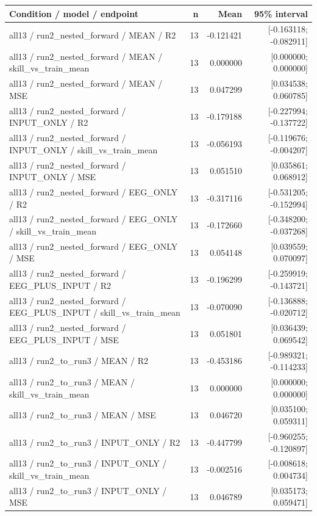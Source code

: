 \begin{longtable}{p{.56\linewidth}rrr}
\toprule Condition / model / endpoint & n & Mean & 95\% interval\\\midrule
all13 / run2\_nested\_forward / MEAN / R2 & 13 & -0.121421 & [-0.163118; -0.082911] \\
all13 / run2\_nested\_forward / MEAN / skill\_vs\_train\_mean & 13 & 0.000000 & [0.000000; 0.000000] \\
all13 / run2\_nested\_forward / MEAN / MSE & 13 & 0.047299 & [0.034538; 0.060785] \\
all13 / run2\_nested\_forward / INPUT\_ONLY / R2 & 13 & -0.179188 & [-0.227994; -0.137722] \\
all13 / run2\_nested\_forward / INPUT\_ONLY / skill\_vs\_train\_mean & 13 & -0.056193 & [-0.119676; -0.004207] \\
all13 / run2\_nested\_forward / INPUT\_ONLY / MSE & 13 & 0.051510 & [0.035861; 0.068912] \\
all13 / run2\_nested\_forward / EEG\_ONLY / R2 & 13 & -0.317116 & [-0.531205; -0.152994] \\
all13 / run2\_nested\_forward / EEG\_ONLY / skill\_vs\_train\_mean & 13 & -0.172660 & [-0.348200; -0.037268] \\
all13 / run2\_nested\_forward / EEG\_ONLY / MSE & 13 & 0.054148 & [0.039559; 0.070097] \\
all13 / run2\_nested\_forward / EEG\_PLUS\_INPUT / R2 & 13 & -0.196299 & [-0.259919; -0.143721] \\
all13 / run2\_nested\_forward / EEG\_PLUS\_INPUT / skill\_vs\_train\_mean & 13 & -0.070090 & [-0.136888; -0.020712] \\
all13 / run2\_nested\_forward / EEG\_PLUS\_INPUT / MSE & 13 & 0.051801 & [0.036439; 0.069542] \\
all13 / run2\_to\_run3 / MEAN / R2 & 13 & -0.453186 & [-0.989321; -0.114233] \\
all13 / run2\_to\_run3 / MEAN / skill\_vs\_train\_mean & 13 & 0.000000 & [0.000000; 0.000000] \\
all13 / run2\_to\_run3 / MEAN / MSE & 13 & 0.046720 & [0.035100; 0.059311] \\
all13 / run2\_to\_run3 / INPUT\_ONLY / R2 & 13 & -0.447799 & [-0.960255; -0.120897] \\
all13 / run2\_to\_run3 / INPUT\_ONLY / skill\_vs\_train\_mean & 13 & -0.002516 & [-0.008618; 0.004734] \\
all13 / run2\_to\_run3 / INPUT\_ONLY / MSE & 13 & 0.046789 & [0.035173; 0.059471] \\

\end{longtable}
